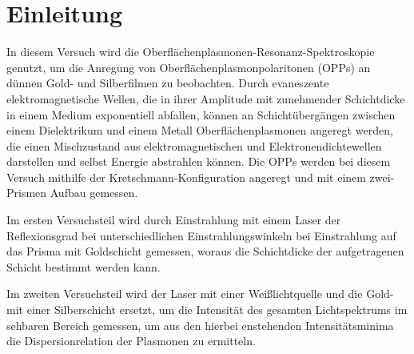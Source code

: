 \section{Einleitung}\label{sec:einleitung}
In diesem Versuch wird die Oberflächenplasmonen-Resonanz-Spektroskopie genutzt,
um die Anregung von Oberflächenplasmonpolaritonen (OPPs) an dünnen Gold- und Silberfilmen
zu beobachten. Durch evaneszente elektromagnetische Wellen, die in ihrer Amplitude 
mit zunehmender Schichtdicke in einem Medium exponentiell abfallen, können an 
Schichtübergängen zwischen einem Dielektrikum und einem Metall Oberflächenplasmonen
angeregt werden, die einen Mischzustand aus elektromagnetischen und Elektronendichtewellen 
darstellen und selbst Energie abstrahlen können. 
Die OPPs werden bei diesem Versuch mithilfe der Kretschmann-Konfiguration angeregt
und mit einem zwei-Prismen Aufbau gemessen.\par
Im ersten Versuchsteil wird durch Einstrahlung mit einem 
Laser der Reflexionsgrad bei unterschiedlichen Einstrahlungswinkeln
bei Einstrahlung auf das Prisma mit Goldschicht gemessen, woraus 
die Schichtdicke der aufgetragenen Schicht bestimmt werden kann.\par 
Im zweiten Versuchsteil wird der Laser mit einer Weißlichtquelle und die Gold- mit 
einer Silberschicht ersetzt, um die Intensität 
des gesamten Lichtspektrums im sehbaren Bereich gemessen, um aus den hierbei 
enstehenden Intensitätsminima die Dispersionrelation der Plasmonen zu ermitteln.
